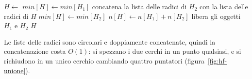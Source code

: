 \begin{algorithm}[htbp]
\caption{L'unione di due heap di Fibonacci, con la concatenazione delle due liste delle radici.}\label{alg:hf-union}
\begin{algorithmic}[1]
  \State $H \gets$ 
  \State $\mathit{min}[H] \gets \mathit{min}[H_1]$
  \State concatena la lista delle radici di $H_2$ con la lista delle radici di $H$
    \State $\mathit{min}[H] \gets \mathit{min}[H_2]$
  \EndIf
  \State $n[H] \gets n[H_1] + n[H_2]$
  \State libera gli oggetti $H_1$ e $H_2$
  \State \Return $H$
\EndProcedure
\end{algorithmic}
\end{algorithm}

Le liste delle radici sono circolari e doppiamente concatenate, quindi la concatenazione costa $O(1)$: si spezzano i due cerchi in un punto qualsiasi, e si richiudono in un unico cerchio cambiando quattro puntatori (figura~\ref{fig:hf-unione}).

